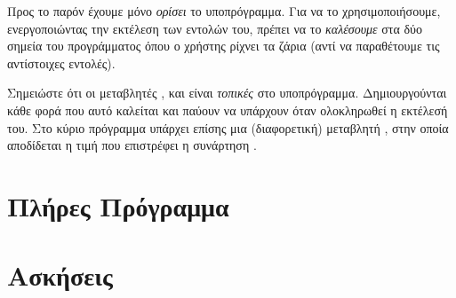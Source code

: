 \documentclass[a4paper,11pt,oneside]{book}
\begin{document}
Προς το παρόν έχουμε μόνο \emph{ορίσει} το υποπρόγραμμα. Για να το χρησιμοποιήσουμε, ενεργοποιώντας την εκτέλεση των εντολών του, πρέπει να το \emph{καλέσουμε} στα δύο σημεία του προγράμματος όπου ο χρήστης ρίχνει τα ζάρια (αντί να παραθέτουμε τις αντίστοιχες εντολές).




Σημειώστε ότι οι μεταβλητές ,  και  είναι \emph{τοπικές} στο υποπρόγραμμα. Δημιουργούνται κάθε φορά που αυτό καλείται και παύουν να υπάρχουν όταν ολοκληρωθεί η εκτέλεσή του. Στο κύριο πρόγραμμα υπάρχει επίσης μια (διαφορετική) μεταβλητή , στην οποία αποδίδεται η τιμή που επιστρέφει η συνάρτηση .



\section{Πλήρες Πρόγραμμα}



\section{Ασκήσεις}
\end{document}
